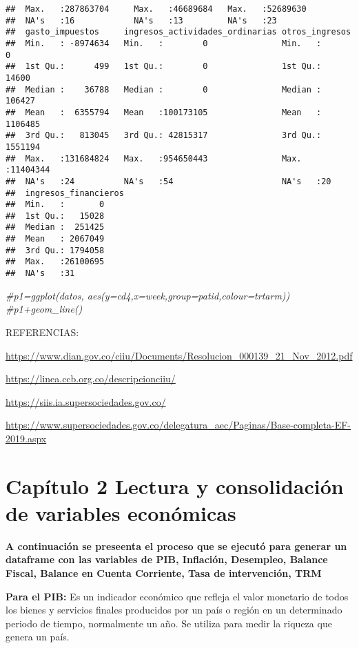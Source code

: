 \documentclass[
  11pt,
]{article}
\newenvironment{Shaded}{\begin{snugshade}}{\end{snugshade}}
\newcommand{\CommentTok}[1]{\textcolor[rgb]{0.56,0.35,0.01}{\textit{#1}}}
\begin{document}
\begin{verbatim}
##  Max.   :287863704     Max.   :46689684   Max.   :52689630  
##  NA's   :16            NA's   :13         NA's   :23        
##  gasto_impuestos     ingresos_actividades_ordinarias otros_ingresos    
##  Min.   : -8974634   Min.   :        0               Min.   :       0  
##  1st Qu.:      499   1st Qu.:        0               1st Qu.:   14600  
##  Median :    36788   Median :        0               Median :  106427  
##  Mean   :  6355794   Mean   :100173105               Mean   : 1106485  
##  3rd Qu.:   813045   3rd Qu.: 42815317               3rd Qu.: 1551194  
##  Max.   :131684824   Max.   :954650443               Max.   :11404344  
##  NA's   :24          NA's   :54                      NA's   :20        
##  ingresos_financieros
##  Min.   :       0    
##  1st Qu.:   15028    
##  Median :  251425    
##  Mean   : 2067049    
##  3rd Qu.: 1794058    
##  Max.   :26100695    
##  NA's   :31
\end{verbatim}

\begin{Shaded}
\begin{Highlighting}[]
\CommentTok{#p1=ggplot(datos, aes(y=cd4,x=week,group=patid,colour=trtarm))}
\CommentTok{#p1+geom_line()}
\end{Highlighting}
\end{Shaded}

REFERENCIAS:

\url{https://www.dian.gov.co/ciiu/Documents/Resolucion_000139_21_Nov_2012.pdf}

\url{https://linea.ccb.org.co/descripcionciiu/}

\url{https://siis.ia.supersociedades.gov.co/}

\url{https://www.supersociedades.gov.co/delegatura_aec/Paginas/Base-completa-EF-2019.aspx}

\hypertarget{capuxedtulo-2-lectura-y-consolidaciuxf3n-de-variables-econuxf3micas}{%
\section{Capítulo 2 Lectura y consolidación de variables
económicas}\label{capuxedtulo-2-lectura-y-consolidaciuxf3n-de-variables-econuxf3micas}}

\textbf{A continuación se preseenta el proceso que se ejecutó para generar un dataframe con las variables de PIB, Inflación, Desempleo, Balance Fiscal, Balance en Cuenta Corriente, Tasa de intervención, TRM}

\textbf{Para el PIB:} Es un indicador económico que refleja el valor
monetario de todos los bienes y servicios finales producidos por un país
o región en un determinado periodo de tiempo, normalmente un año. Se
utiliza para medir la riqueza que genera un país.
\end{document}
